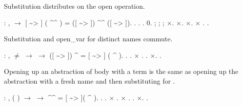 \documentclass[12pt]{report}
\begin{document}
Substitution distributes on the open operation. \begin{coqdoccode}
\coqdocemptyline
\coqdocnoindent
{}  : \coqdockw{\ensuremath{\forall}}    ,   \ensuremath{\rightarrow} \coqdoceol
\coqdocindent{1.00em}
[ \~{}> ] ( \^{}\^{} ) = ([ \~{}> ]) \^{}\^{} ([ \~{}> ]).\coqdoceol
\coqdocnoindent
{}.\coqdoceol
\coqdocindent{1.00em}
.  .  0.\coqdoceol
\coqdocindent{1.00em}
 ; ; ; \ensuremath{\times}.\coqdoceol
\coqdocindent{1.00em}
\ensuremath{\times}. \ensuremath{\times}. \ensuremath{\times} .\coqdoceol
\coqdocnoindent
{}.\coqdoceol
\coqdocemptyline
\end{coqdoccode}
Substitution and open\_var for distinct names commute. \begin{coqdoccode}
\coqdocemptyline
\coqdocnoindent
{}  : \coqdockw{\ensuremath{\forall}}    ,  \ensuremath{\not=}  \ensuremath{\rightarrow}   \ensuremath{\rightarrow}\coqdoceol
\coqdocindent{1.00em}
([ \~{}> ]) \^{}  = [ \~{}> ] ( \^{} ).\coqdoceol
\coqdocnoindent
{}.   . \ensuremath{\times} . . \ensuremath{\times}. .\coqdoceol
\coqdocemptyline
\end{coqdoccode}
Opening up an abstraction of body  with a term  is the same as opening
  up the abstraction with a fresh name  and then substituting  for . \begin{coqdoccode}
\coqdocemptyline
\coqdocnoindent
{}  : \coqdockw{\ensuremath{\forall}}   , \coqdoceol
\coqdocindent{1.00em}
  ( ) \ensuremath{\rightarrow}   \ensuremath{\rightarrow}\coqdoceol
\coqdocindent{1.00em}
 \^{}\^{}  = [ \~{}> ]( \^{} ).\coqdoceol
\coqdocnoindent
{}.\coqdoceol
\coqdocindent{1.00em}
  . \ensuremath{\times} .\coqdoceol
\coqdocindent{1.00em}
\ensuremath{\times} . . \ensuremath{\times}.\coqdoceol
\coqdocnoindent
{}.\coqdoceol
\coqdocemptyline
\end{coqdoccode}
\end{document}
